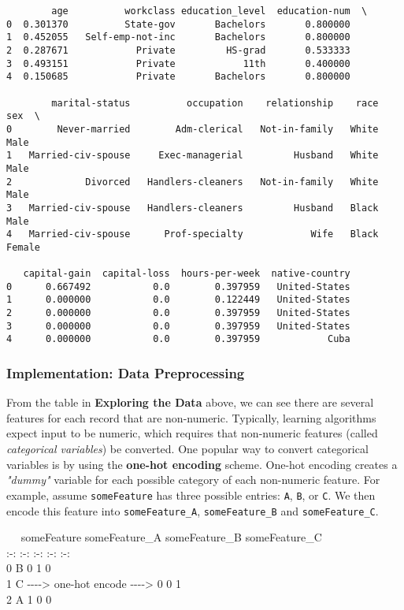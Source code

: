 \documentclass[11pt]{article}
\begin{document}
    
    \begin{verbatim}
        age          workclass education_level  education-num  \
0  0.301370          State-gov       Bachelors       0.800000   
1  0.452055   Self-emp-not-inc       Bachelors       0.800000   
2  0.287671            Private         HS-grad       0.533333   
3  0.493151            Private            11th       0.400000   
4  0.150685            Private       Bachelors       0.800000   

        marital-status          occupation    relationship    race      sex  \
0        Never-married        Adm-clerical   Not-in-family   White     Male   
1   Married-civ-spouse     Exec-managerial         Husband   White     Male   
2             Divorced   Handlers-cleaners   Not-in-family   White     Male   
3   Married-civ-spouse   Handlers-cleaners         Husband   Black     Male   
4   Married-civ-spouse      Prof-specialty            Wife   Black   Female   

   capital-gain  capital-loss  hours-per-week  native-country  
0      0.667492           0.0        0.397959   United-States  
1      0.000000           0.0        0.122449   United-States  
2      0.000000           0.0        0.397959   United-States  
3      0.000000           0.0        0.397959   United-States  
4      0.000000           0.0        0.397959            Cuba  
    \end{verbatim}

    
    \subsubsection{Implementation: Data
Preprocessing}\label{implementation-data-preprocessing}

From the table in \textbf{Exploring the Data} above, we can see there
are several features for each record that are non-numeric. Typically,
learning algorithms expect input to be numeric, which requires that
non-numeric features (called \emph{categorical variables}) be converted.
One popular way to convert categorical variables is by using the
\textbf{one-hot encoding} scheme. One-hot encoding creates a
\emph{"dummy"} variable for each possible category of each non-numeric
feature. For example, assume \texttt{someFeature} has three possible
entries: \texttt{A}, \texttt{B}, or \texttt{C}. We then encode this
feature into \texttt{someFeature\_A}, \texttt{someFeature\_B} and
\texttt{someFeature\_C}.

~~\textbar{} someFeature \textbar{} \textbar{} someFeature\_A \textbar{}
someFeature\_B \textbar{} someFeature\_C \textbar{}\\
:-: \textbar{} :-: \textbar{} \textbar{} :-: \textbar{} :-: \textbar{}
:-: \textbar{}\\
0 \textbar{} B \textbar{} \textbar{} 0 \textbar{} 1 \textbar{} 0
\textbar{}\\
1 \textbar{} C \textbar{} -\/-\/-\/-\textgreater{} one-hot encode
-\/-\/-\/-\textgreater{} \textbar{} 0 \textbar{} 0 \textbar{} 1
\textbar{}\\
2 \textbar{} A \textbar{} \textbar{} 1 \textbar{} 0 \textbar{} 0
\textbar{}
\end{document}
